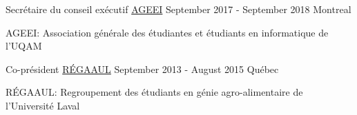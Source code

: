 

\begin{cventries}

  \cventry
    {Secrétaire du conseil exécutif}%
    {\href{https://ageei.uqam.ca}{AGEEI}}%
    {September 2017 - September 2018} %
    {Montreal} %
    {
      \begin{cvitems} %
        \item {AGEEI: Association générale des étudiantes et étudiants
               en informatique de l'UQAM}
      \end{cvitems}
    }

  \cventry
    {Co-président} %
    {\href{https://agetaac.asso.ulaval.ca/index.html}
          {RÉGAAUL}} %
    {September 2013 - August 2015} %
    {Québec} %
    {
      \begin{cvitems} %
        \item {RÉGAAUL: Regroupement des étudiants en génie agro-alimentaire de
              l'Université Laval}
      \end{cvitems}
    }

\end{cventries}
